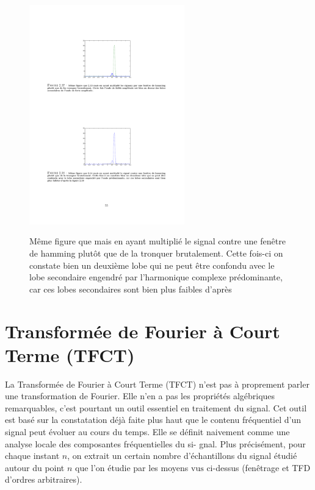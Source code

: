 \begin{definition}
\begin{figure}
  \centering
  \includegraphics[width=0.6\textwidth]{Figures/Figure2-18}\\
  \caption{M\^{e}me figure que  mais en ayant multipli\'{e} le signal contre une fen\^{e}tre de hamming plut\^{o}t que de la tronquer brutalement. Cette fois-ci on constate bien un deuxi\`{e}me lobe qui ne peut \^{e}tre confondu avec le lobe secondaire engendr\'{e} par l'harmonique complexe pr\'{e}dominante, car ces lobes secondaires sont bien plus faibles d'apr\`{e}s }\label{fig:figure2-18}
\end{figure}


\section{Transformée de Fourier à Court Terme (TFCT)}
La Transform\'{e}e de Fourier \`{a} Court Terme (TFCT) n'est pas \`{a} proprement parler une transformation de Fourier. Elle n'en a pas les propri\'{e}t\'{e}s alg\'{e}briques remarquables, c'est pourtant un outil essentiel en traitement du signal. Cet outil est bas\'{e} sur la constatation d\'{e}j\`{a} faite plus haut que le contenu fr\'{e}quentiel d'un signal peut \'{e}voluer au cours du temps. Elle se d\'{e}finit naivement comme une analyse locale des composantes fr\'{e}quentielles du si- gnal. Plus pr\'{e}cis\'{e}ment, pour chaque instant $n$, on extrait un certain nombre d'\'{e}chantillons du signal \'{e}tudi\'{e} autour du point $n$ que l'on \'{e}tudie par les moyens $\mathrm{v}\mathrm{u}\mathrm{s}$ ci-dessus (fen\^{e}trage et TFD d'ordres arbitraires).


\end{definition}
